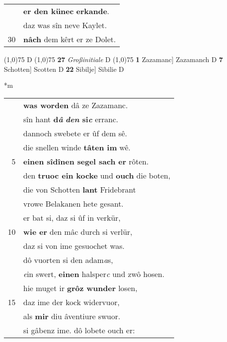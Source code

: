 \documentclass[8pt,a4paper,notitlepage]{article}
\begin{document}
\begin{table}[ht]
\begin{minipage}[t]{0.5\linewidth}
\begin{tabular}{rl}
 & \textbf{er den künec} \textbf{erkande}.\\ 
 & daz was sîn neve Kaylet.\\ 
30 & \textbf{nâch} dem kêrt er ze Dolet.\\ 
\end{tabular}
\scriptsize
\line(1,0){75} \newline
D \newline
\line(1,0){75} \newline
\textbf{27} \textit{Großinitiale} D  \newline
\line(1,0){75} \newline
\textbf{1} Zazamanc] Zazamanch D \textbf{7} Schotten] Scotten D \textbf{22} Sibilje] Sibilie D \newline
\end{minipage}
\hspace{0.5cm}
\begin{minipage}[t]{0.5\linewidth}
\small
\begin{center}*m
\end{center}
\begin{tabular}{rl}
 & \textbf{was worden} dâ ze Zazamanc.\\ 
 & sîn hant \textbf{d\textit{â}} \textbf{\textit{den} si\textit{c}} erranc.\\ 
 & dannoch swebete er ûf dem sê.\\ 
 & die snellen winde \textbf{tâten im} wê.\\ 
5 & \textbf{einen sîdînen segel sach er} rôten.\\ 
 & den \textbf{truoc ein kocke} und \textbf{ouch} die boten,\\ 
 & die von Schotten \textbf{lant} Fridebrant\\ 
 & vrowe Belakanen hete gesant.\\ 
 & er bat si, daz si ûf in verkür,\\ 
10 & \textbf{wie er} den mâc durch si verlür,\\ 
 & daz si von ime gesuochet was.\\ 
 & dô vuorten si den adam\textit{a}s,\\ 
 & \textit{e}in swert, \textbf{einen} halsper\textit{c} und zwô hosen.\\ 
 & hie muget ir \textbf{grôz wunder} losen,\\ 
15 & daz ime der kock widervuor,\\ 
 & als \textbf{mir} diu âventiure swuor.\\ 
 & si gâbenz ime. dô lobete ouch er:\\ 

\end{tabular}
\end{minipage}
\end{table}
\end{document}
